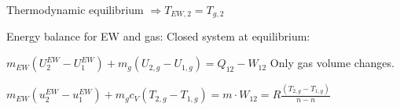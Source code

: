 Thermodynamic equilibrium \( \Rightarrow T_{EW,2} = T_{g,2} \)  

Energy balance for EW and gas:  
Closed system at equilibrium:  

\( m_{EW} (U_{2}^{EW} - U_{1}^{EW}) + m_g (U_{2,g} - U_{1,g}) = Q_{12} - W_{12} \)  
Only gas volume changes.  

\( m_{EW} (u_{2}^{EW} - u_{1}^{EW}) + m_g c_V (T_{2,g} - T_{1,g}) = m \cdot W_{12} = R \frac{(T_{2,g} - T_{1,g})}{n - n} \)